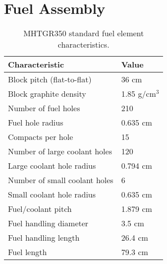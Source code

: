 \documentclass[11pt,letterpaper]{article}
\begin{document}
\section{Fuel Assembly}

	\begin{table}[htbp!]
		\centering
	    \caption{MHTGR350 standard fuel element characteristics.}
	    \label{tab:scharacteristics}
		\begin{tabular}{l|l}
		\hline
		Characteristic                   & Value         \\ \hline
		Block pitch (flat-to-flat)       & 36 cm         \\
		Block graphite density           & 1.85 g/cm$^3$ \\
		Number of fuel holes             & 210           \\
		Fuel hole radius                 & 0.635 cm      \\
		Compacts per hole                & 15            \\
		Number of large coolant holes    & 120           \\
		Large coolant hole radius        & 0.794 cm      \\
		Number of small coolant holes    & 6             \\
		Small coolant hole radius        & 0.635 cm      \\
		Fuel/coolant pitch               & 1.879 cm      \\
		Fuel handling diameter           & 3.5 cm        \\ 
		Fuel handling length             & 26.4 cm       \\ 
		Fuel length                      & 79.3 cm       \\ \hline
		\end{tabular}
	\end{table}
\end{document}
